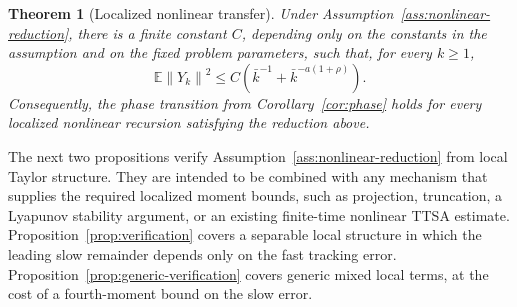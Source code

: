 \documentclass{article}
\newtheorem{theorem}{Theorem}[section]
\newcommand{\E}{\mathbb{E}}
\newcommand{\norm}[1]{\left\lVert #1\right\rVert}
\begin{document}
\begin{theorem}[Localized nonlinear transfer]\label{thm:localized-transfer}
Under Assumption~\ref{ass:nonlinear-reduction}, there is a finite constant $C$, depending only on the constants in the assumption and on the fixed problem parameters, such that, for every $k\ge1$,
\begin{equation}
  \E\norm{Y_k}^2
  \le C\left(\bar k^{-1}+\bar k^{-a(1+\rho)}\right). \label{eq:localized-transfer-rate}
\end{equation}
Consequently, the phase transition from Corollary~\ref{cor:phase} holds for every localized nonlinear recursion satisfying the reduction above.
\end{theorem}

The next two propositions verify Assumption~\ref{ass:nonlinear-reduction} from local Taylor structure. They are intended to be combined with any mechanism that supplies the required localized moment bounds, such as projection, truncation, a Lyapunov stability argument, or an existing finite-time nonlinear TTSA estimate. Proposition~\ref{prop:verification} covers a separable local structure in which the leading slow remainder depends only on the fast tracking error. Proposition~\ref{prop:generic-verification} covers generic mixed local terms, at the cost of a fourth-moment bound on the slow error.
\end{document}
